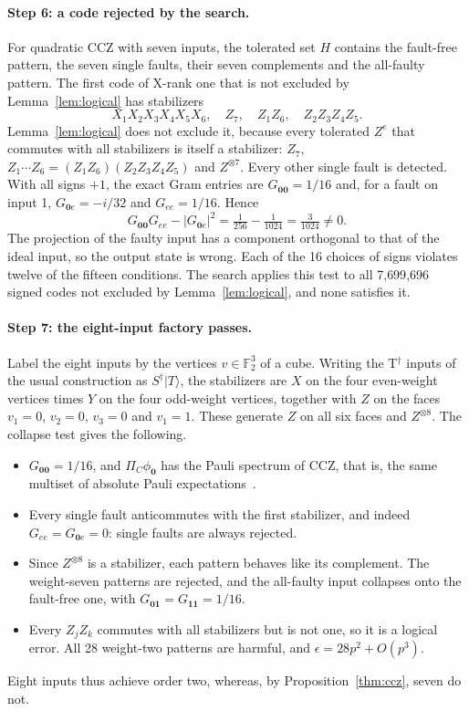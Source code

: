 \documentclass[aps,prl,reprint,twocolumn,amsmath,amssymb,floatfix,nofootinbib,superscriptaddress]{revtex4-2}
\newcommand{\F}{\mathbb F_2}
\begin{document}
\paragraph*{Step 6: a code rejected by the search.}
For quadratic CCZ with seven inputs, the tolerated set $H$ contains the fault-free pattern, the seven single faults, their seven complements and the all-faulty pattern. The first code of X-rank one that is not excluded by Lemma~\ref{lem:logical} has stabilizers
\begin{equation}
 X_1X_2X_3X_4X_5X_6,\quad Z_7,\quad Z_1Z_6,\quad Z_2Z_3Z_4Z_5.
\end{equation}
Lemma~\ref{lem:logical} does not exclude it, because every tolerated $Z^e$ that commutes with all stabilizers is itself a stabilizer: $Z_7$, $Z_1\cdots Z_6=(Z_1Z_6)(Z_2Z_3Z_4Z_5)$ and $Z^{\otimes7}$. Every other single fault is detected. With all signs $+1$, the exact Gram entries are $G_{\mathbf0\mathbf0}=1/16$ and, for a fault on input 1, $G_{\mathbf0e}=-i/32$ and $G_{ee}=1/16$. Hence
\begin{equation}
 G_{\mathbf0\mathbf0}G_{ee}-|G_{\mathbf0e}|^2=\tfrac1{256}-\tfrac1{1024}=\tfrac3{1024}\neq0 .
\end{equation}
The projection of the faulty input has a component orthogonal to that of the ideal input, so the output state is wrong. Each of the 16 choices of signs violates twelve of the fifteen conditions. The search applies this test to all 7{,}699{,}696 signed codes not excluded by Lemma~\ref{lem:logical}, and none satisfies it.

\paragraph*{Step 7: the eight-input factory passes.}
Label the eight inputs by the vertices $v\in\F^3$ of a cube. Writing the T$^\dagger$ inputs of the usual construction as $S^\dagger|T\rangle$, the stabilizers are $X$ on the four even-weight vertices times $Y$ on the four odd-weight vertices, together with $Z$ on the faces $v_1=0$, $v_2=0$, $v_3=0$ and $v_1=1$. These generate $Z$ on all six faces and $Z^{\otimes8}$. The collapse test gives the following.
\begin{itemize}
\item $G_{\mathbf0\mathbf0}=1/16$, and $\Pi_C\phi_{\mathbf0}$ has the Pauli spectrum of CCZ, that is, the same multiset of absolute Pauli expectations~\cite{beverland}.
\item Every single fault anticommutes with the first stabilizer, and indeed $G_{ee}=G_{\mathbf0e}=0$: single faults are always rejected.
\item Since $Z^{\otimes8}$ is a stabilizer, each pattern behaves like its complement. The weight-seven patterns are rejected, and the all-faulty input collapses onto the fault-free one, with $G_{\mathbf0\mathbf1}=G_{\mathbf1\mathbf1}=1/16$.
\item Every $Z_jZ_k$ commutes with all stabilizers but is not one, so it is a logical error. All 28 weight-two patterns are harmful, and $\epsilon=28p^2+O(p^3)$.
\end{itemize}
Eight inputs thus achieve order two, whereas, by Proposition~\ref{thm:ccz}, seven do not.
\end{document}
